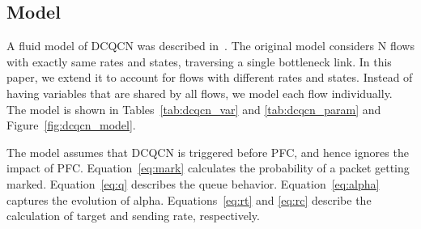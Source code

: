 \subsection{Model}

A fluid model of DCQCN was described in~\cite{dcqcn}. The original model
considers N flows with exactly same rates and states, traversing a single
bottleneck link.  In this paper, we extend it to account for flows with
different rates and states.  Instead of having variables that are shared by all
flows, we model each flow individually. The model is shown in
Tables~\ref{tab:dcqcn_var} and \ref{tab:dcqcn_param} and
Figure~\ref{fig:dcqcn_model}.

The model assumes that DCQCN is triggered before PFC, and hence
ignores the impact of PFC. Equation~\ref{eq:mark} calculates the probability of
a packet getting marked.  Equation~\ref{eq:q} describes the queue behavior.
Equation~\ref{eq:alpha} captures the evolution of alpha.  Equations~\ref{eq:rt}
and \ref{eq:rc} describe the calculation of target and sending rate,
respectively. 
